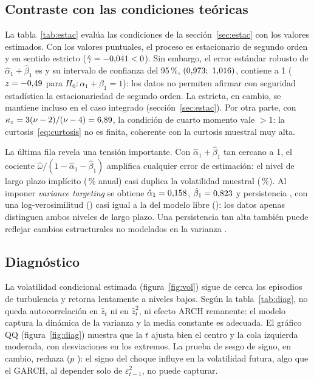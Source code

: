 \documentclass[legalpaper,11pt]{article}
\begin{document}
\subsection{Contraste con las condiciones teóricas}
La tabla~\ref{tab:estac} evalúa las condiciones de la sección~\ref{sec:estac} con los valores estimados.
Con los valores puntuales, el proceso es estacionario de segundo orden y en sentido estricto
($\hat\gamma=-0{,}041<0$). Sin embargo, el error estándar robusto de
$\hat\alpha_1+\hat\beta_1$ es \gSEpers{} y su intervalo de confianza del 95\,\%,
$(0{,}973;\ 1{,}016)$, contiene a 1 ($z=-0{,}49$ para $H_0:\alpha_1+\beta_1=1$): los datos no
permiten afirmar con seguridad estadística la estacionariedad de segundo orden. La estricta, en
cambio, se mantiene incluso en el caso integrado (sección~\ref{sec:estac}). Por otra parte, con $\kappa_z=3(\nu-2)/(\nu-4)=6{,}89$, la condición
de cuarto momento vale \gCuarto{} $>1$: la curtosis~\eqref{eq:curtosis} no es finita, coherente
con la curtosis muestral muy alta.

\begin{table}[H]
\centering\small
\caption{Condiciones de estacionariedad y momentos evaluadas en las estimaciones.}
\label{tab:estac}

\end{table}

La última fila revela una tensión importante. Con $\hat\alpha_1+\hat\beta_1$ tan cercano a 1, el
cociente $\hat\omega/(1-\hat\alpha_1-\hat\beta_1)$ amplifica cualquier error de estimación: el
nivel de largo plazo implícito (\gVolInc\,\% anual) casi duplica la volatilidad muestral
(\gVolMuestral\,\%). Al imponer \emph{variance targeting} se obtiene $\hat\alpha_1=0{,}158$,
$\hat\beta_1=0{,}823$ y persistencia \gVTpersist, con una log-verosimilitud
(\gVTll) casi igual a la del modelo libre (\gLLt): los datos apenas distinguen ambos niveles
de largo plazo. Una persistencia tan alta también puede reflejar cambios estructurales no
modelados en la varianza \citep{lamoureux1990}.

\subsection{Diagnóstico}
La volatilidad condicional estimada (figura~\ref{fig:vol}) sigue de cerca los episodios de
turbulencia y retorna lentamente a niveles bajos. Según la tabla~\ref{tab:diag}, no queda
autocorrelación en $\hat z_t$ ni en $\hat z_t^2$, ni efecto ARCH remanente: el modelo captura la
dinámica de la varianza y la media constante es adecuada. El gráfico QQ (figura~\ref{fig:diag})
muestra que la $t$ ajusta bien el centro y la cola izquierda moderada, con desviaciones en los
extremos. La prueba de sesgo de signo, en cambio, rechaza ($p$ \gSBp): el signo del choque
influye en la volatilidad futura, algo que el GARCH, al depender solo de $\varepsilon_{t-1}^2$,
no puede capturar.
\end{document}
